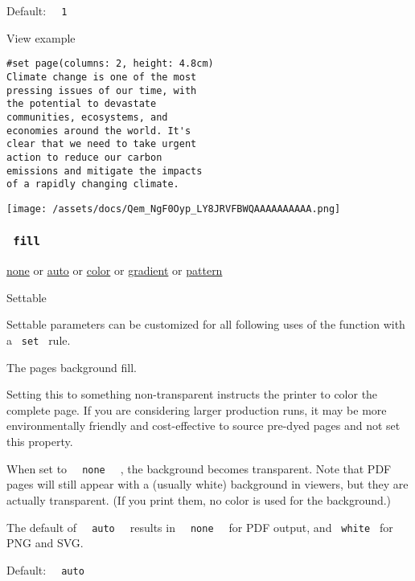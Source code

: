 Default: \texttt{\ }{\texttt{\ 1\ }}\texttt{\ }


View example

\begin{verbatim}
#set page(columns: 2, height: 4.8cm)
Climate change is one of the most
pressing issues of our time, with
the potential to devastate
communities, ecosystems, and
economies around the world. It's
clear that we need to take urgent
action to reduce our carbon
emissions and mitigate the impacts
of a rapidly changing climate.
\end{verbatim}

\texttt{[image: /assets/docs/Qem\_NgF0Oyp\_LY8JRVFBWQAAAAAAAAAA.png]}

\subsubsection{\texorpdfstring{\texttt{\ fill\ }}{ fill }}\label{parameters-fill}

\href{/docs/reference/foundations/none/}{none} {or}
\href{/docs/reference/foundations/auto/}{auto} {or}
\href{/docs/reference/visualize/color/}{color} {or}
\href{/docs/reference/visualize/gradient/}{gradient} {or}
\href{/docs/reference/visualize/pattern/}{pattern}

{{ Settable }}

\label{parameters-fill-settable-tooltip}
Settable parameters can be customized for all following uses of the
function with a \texttt{\ set\ } rule.

The page\textquotesingle s background fill.

Setting this to something non-transparent instructs the printer to color
the complete page. If you are considering larger production runs, it may
be more environmentally friendly and cost-effective to source pre-dyed
pages and not set this property.

When set to \texttt{\ }{\texttt{\ none\ }}\texttt{\ } , the background
becomes transparent. Note that PDF pages will still appear with a
(usually white) background in viewers, but they are actually
transparent. (If you print them, no color is used for the background.)

The default of \texttt{\ }{\texttt{\ auto\ }}\texttt{\ } results in
\texttt{\ }{\texttt{\ none\ }}\texttt{\ } for PDF output, and
\texttt{\ white\ } for PNG and SVG.

Default: \texttt{\ }{\texttt{\ auto\ }}\texttt{\ }

